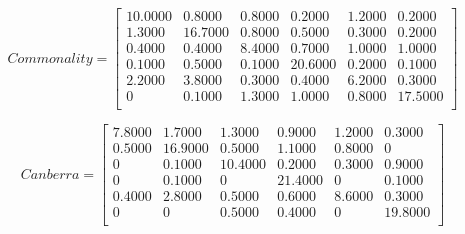 \documentclass[a4paper,12pt,oneside,final]{report}
\begin{document}
\[
Commonality = \left[\begin{array}{cccccc}
   10.0000 &   0.8000  &  0.8000 &   0.2000  &  1.2000  &  0.2000\\
    1.3000 &  16.7000  &  0.8000 &   0.5000  &  0.3000  &  0.2000\\
    0.4000 &   0.4000  &  8.4000 &   0.7000  &  1.0000  &  1.0000\\
    0.1000 &   0.5000  &  0.1000 &  20.6000  &  0.2000  &  0.1000\\
    2.2000 &   3.8000  &  0.3000 &   0.4000  &  6.2000  &  0.3000\\
         0 &   0.1000  &  1.3000 &   1.0000  &  0.8000  & 17.5000\\
\end{array}
\right]
\]

\[
Canberra = \left[\begin{array}{cccccc}
7.8000  &  1.7000 &   1.3000  &  0.9000  &  1.2000 &   0.3000 \\
    0.5000 &  16.9000 &   0.5000 &   1.1000   & 0.8000  &       0 \\
         0 &   0.1000 &  10.4000 &   0.2000   & 0.3000  &  0.9000 \\
         0 &   0.1000 &        0 &  21.4000   &      0  &  0.1000 \\
    0.4000 &   2.8000 &   0.5000 &   0.6000   & 8.6000  &  0.3000 \\
         0 &        0 &   0.5000 &   0.4000   &      0  & 19.8000 \\
\end{array}
\right]
\]
\end{document}
